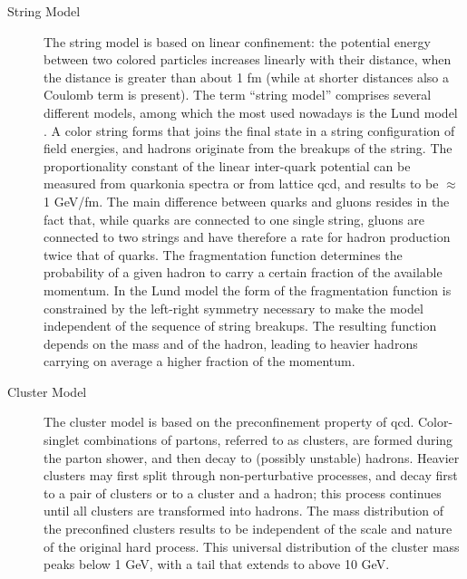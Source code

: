 \begin{description}
\item[String Model] The string model \cite{Artru:1974hr} 
is based on linear confinement: the potential energy between two colored particles increases linearly with their distance, when the distance is greater than about 1 fm (while at shorter distances also a Coulomb term is present). The term ``string model'' comprises several different models, among which the most used nowadays is the Lund model \cite{Andersson:1983ia,Andersson:1998tv}. 
A color string forms that joins the final state in a string configuration of field energies, and hadrons originate from the breakups of the string. The proportionality constant of the linear inter-quark potential can be measured from quarkonia spectra or from lattice \gls{qcd}, and results to be $\approx$ 1 GeV/fm.
The main difference between quarks and gluons resides in the fact that, while quarks are connected to one single string, gluons are connected to two strings and have therefore a rate for hadron production twice that of quarks. 
The fragmentation function determines the probability of a given hadron to carry a certain fraction of the available momentum. In the Lund model the form of the fragmentation function is constrained by the left-right symmetry necessary to make the model independent of the sequence of string breakups. The resulting function depends on the mass and \pt of the hadron, leading to heavier hadrons carrying on average a higher fraction of the momentum.

\item[Cluster Model] The cluster model  
is based on the preconfinement property of \gls{qcd}. 
Color-singlet combinations of partons, referred to as clusters, are formed during the parton shower,  
and then decay to (possibly unstable) hadrons. 
Heavier clusters may first split through non-perturbative processes, and decay first to a pair of clusters or to a cluster and a hadron; 
this process continues until all clusters are transformed into hadrons. 
The mass distribution of the preconfined clusters results to be independent of the scale and nature of the original hard process. This universal distribution of the cluster mass peaks below 1 GeV, with a tail that extends to above 10 GeV.

\end{description}

